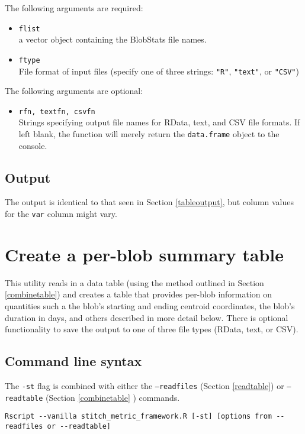 \documentclass{article}
\begin{document}
The following arguments are required:
\begin{itemize}
\item[] \texttt{flist}\\ a vector object containing the BlobStats file names.
\item[] \texttt{ftype}\\ File format of input files (specify one of three strings: \texttt{"R"}, \texttt{"text"}, or \texttt{"CSV"})
\end{itemize}

The following arguments are optional:
\begin{itemize}
\item[] \texttt{rfn, textfn, csvfn}\\Strings specifying output file names for RData, text, and CSV file formats. If left blank, the function will merely return the \texttt{data.frame} object to the console.
\end{itemize}

\subsection{Output}
The output is identical to that seen in Section \ref{tableoutput}, but column values for the \texttt{var} column might vary.

\section{Create a per-blob summary table}
This utility reads in a data table (using the method outlined in Section \ref{combinetable}) and creates a table that provides per-blob information on quantities such a the blob's starting and ending centroid coordinates, the blob's duration in days, and others described in more detail below.  There is optional functionality to save the output to one of three file types (RData, text, or CSV).


\subsection{Command line syntax}
The \texttt{-st} flag is combined with either the \texttt{--readfiles} (Section \ref{readtable}) or \texttt{--readtable} (Section \ref{combinetable} 
) commands.

\begin{verbatim}
Rscript --vanilla stitch_metric_framework.R [-st] [options from --readfiles or --readtable]

\end{verbatim}
\end{document}
